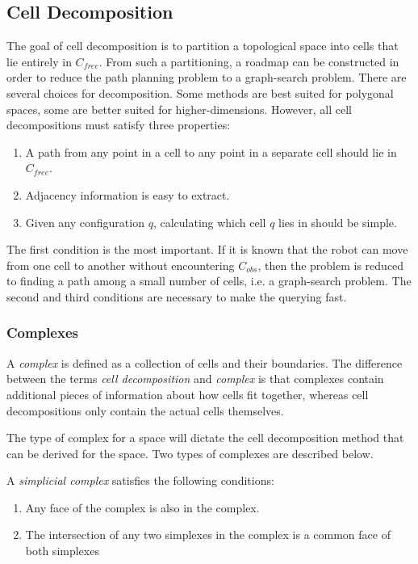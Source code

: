 \documentclass[10pt,conference]{ieeeconf}
\begin{document}
\subsection{Cell Decomposition}

The goal of cell decomposition is to partition a topological space into cells that lie entirely in $C_{free}$. From such a partitioning, a roadmap can be constructed in order to reduce the path planning problem to a graph-search problem. There are several choices for decomposition. Some methods are best suited for polygonal spaces, some are better suited for higher-dimensions. However, all cell decompositions must satisfy three properties:

\begin{enumerate}
\item A path from any point in a cell to any point in a separate cell should lie in $C_{free}$.

\item Adjacency information is easy to extract.

\item Given any configuration $q$, calculating which cell $q$ lies in should be simple.
\end{enumerate}

The first condition is the most important. If it is known that the robot can move from one cell to another without encountering $C_{obs}$, then the problem is reduced to finding a path among a small number of cells, i.e. a graph-search problem. The second and third conditions are necessary to make the querying fast.


\subsubsection{Complexes}

A \emph{complex} is defined as a collection of cells and their boundaries. The difference between the terms \emph{cell decomposition} and \emph{complex} is that complexes contain additional pieces of information about how cells fit together, whereas cell decompositions only contain the actual cells themselves. 

The type of complex for a space will dictate the cell decomposition method that can be derived for the space. Two types of complexes are described below.

A \emph{simplicial complex} satisfies the following conditions:

\begin{enumerate}
\item Any face of the complex is also in the complex.
\item The intersection of any two simplexes in the complex is a common face of both simplexes
\end{enumerate}
\end{document}
